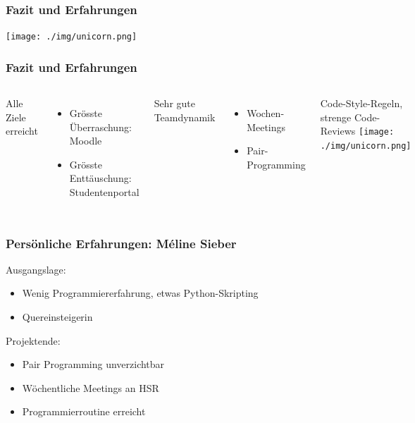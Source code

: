\documentclass{beamer}
\begin{document}
	\begin{frame}
	\frametitle{Fazit und Erfahrungen}
	\begin{center}
	\texttt{[image: ./img/unicorn.png]}
	\end{center}
	\end{frame}
	
	\begin{frame}
		\frametitle{Fazit und Erfahrungen}
		\begin{columns}
			Alle Ziele erreicht
				\begin{itemize}
					    \item Grösste Überraschung: Moodle
					    \item Grösste Enttäuschung: Studentenportal
				\end{itemize}
			Sehr gute Teamdynamik
			\begin{itemize}
				\item Wochen-Meetings	
				\item Pair-Programming
			\end{itemize}
			Code-Style-Regeln, strenge Code-Reviews
			\texttt{[image: ./img/unicorn.png]}
		\end{columns}

	\end{frame}
	\begin{frame}
	  	\frametitle{Persönliche Erfahrungen: Méline Sieber}
	  	Ausgangslage: 
		\begin{itemize}
			\item Wenig Programmiererfahrung, etwas Python-Skripting
			\item Quereinsteigerin
		\end{itemize}
		\pause
		Projektende:
			\begin{itemize}
				\item Pair Programming unverzichtbar
				\item Wöchentliche Meetings an HSR
				\item Programmierroutine erreicht
			\end{itemize}
	\end{frame}
	
\end{document}
